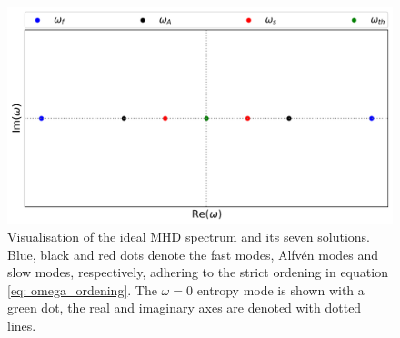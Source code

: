 \begin{figure}[t]
  \centering
  \includegraphics[width=\textwidth]{spectrum_adiabatic.png}
  \caption{
    Visualisation of the ideal MHD spectrum and its seven solutions.
    Blue, black and red dots denote the fast modes, Alfv\'en modes and slow modes, respectively, adhering to the strict ordening in equation \eqref{eq: omega_ordening}. The $\omega = 0$ entropy mode is shown with a green dot, the real and imaginary axes are denoted with dotted lines.
  }
  \label{fig: adiabatic_spectrum}
\end{figure}

